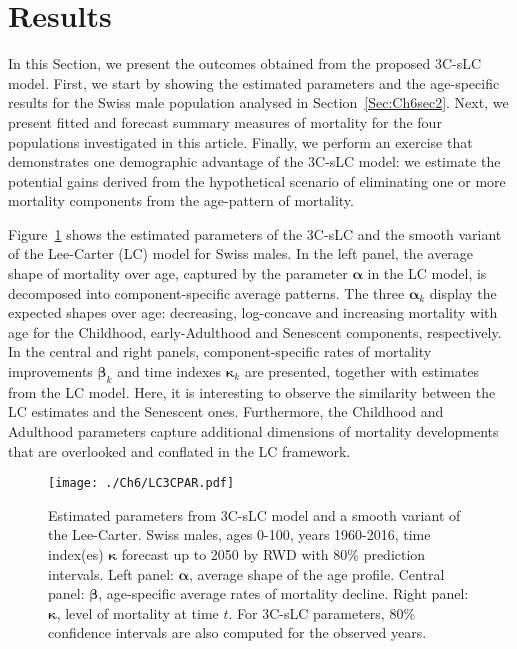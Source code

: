\documentclass[Thesis]{subfiles}
\begin{document}
\section{Results}\label{Sec:Ch6sec3}

In this Section, we present the outcomes obtained from the proposed 3C-sLC model. First, we start by showing the estimated parameters and the age-specific results for the Swiss male population analysed in Section~\ref{Sec:Ch6sec2}. Next, we present fitted and forecast summary measures of mortality for the four populations investigated in this article. Finally, we perform an exercise that demonstrates one demographic advantage of the 3C-sLC model: we estimate the potential gains derived from the hypothetical scenario of eliminating one or more mortality components from the age-pattern of mortality.  

Figure~\ref{fig:LC3CPAR} shows the estimated parameters of the 3C-sLC and the smooth variant of the Lee-Carter (LC) model for Swiss males. In the left panel, the average shape of mortality over age, captured by the parameter $\bm{\alpha}$ in the LC model, is decomposed into component-specific average patterns. The three $\bm{\alpha}_k$ display the expected shapes over age: decreasing, log-concave and increasing mortality with age for the Childhood, early-Adulthood and Senescent components, respectively. In the central and right panels, component-specific rates of mortality improvements $\bm{\beta}_k$ and time indexes $\bm{\kappa}_k$ are presented, together with estimates from the LC model. Here, it is interesting to observe the similarity between the LC estimates and the Senescent ones. Furthermore, the Childhood and Adulthood parameters capture additional dimensions of mortality developments that are overlooked and conflated in the LC framework.

\begin{figure}[!ht]\centering
	\texttt{[image: ./Ch6/LC3CPAR.pdf]}
	\caption{\label{fig:LC3CPAR} Estimated parameters from 3C-sLC model and a smooth variant of the Lee-Carter. Swiss males, ages 0-100, years 1960-2016, time index(es) $\bm{\kappa}$ forecast up to 2050 by RWD with 80\% prediction intervals. Left panel: $\bm{\alpha}$, average shape of the age profile. Central panel: $\bm{\beta}$, age-specific average rates of mortality decline. Right panel: $\bm{\kappa}$, level of mortality at time $t$. For 3C-sLC parameters, 80\% confidence intervals are also computed for the observed years.}  
\end{figure}
\end{document}
